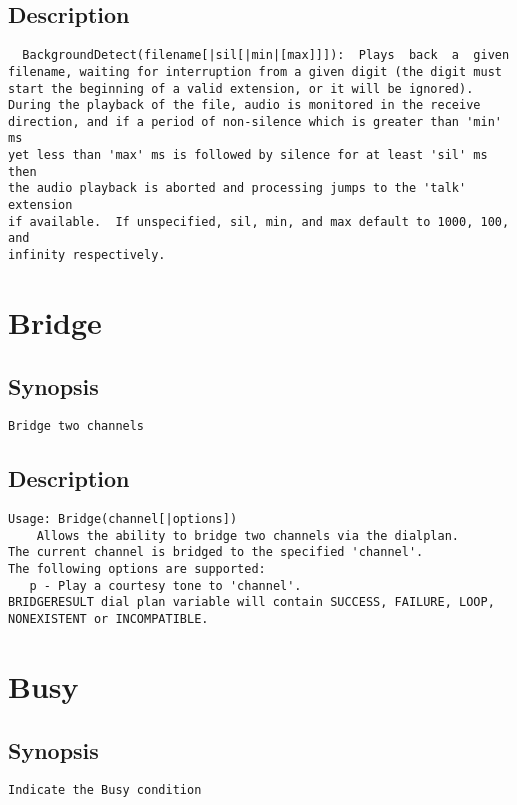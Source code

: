 \subsection{Description}
\begin{verbatim}
  BackgroundDetect(filename[|sil[|min|[max]]]):  Plays  back  a  given
filename, waiting for interruption from a given digit (the digit must
start the beginning of a valid extension, or it will be ignored).
During the playback of the file, audio is monitored in the receive
direction, and if a period of non-silence which is greater than 'min' ms
yet less than 'max' ms is followed by silence for at least 'sil' ms then
the audio playback is aborted and processing jumps to the 'talk' extension
if available.  If unspecified, sil, min, and max default to 1000, 100, and
infinity respectively.

\end{verbatim}


\section{Bridge}
\subsection{Synopsis}
\begin{verbatim}
Bridge two channels
\end{verbatim}
\subsection{Description}
\begin{verbatim}
Usage: Bridge(channel[|options])
	Allows the ability to bridge two channels via the dialplan.
The current channel is bridged to the specified 'channel'.
The following options are supported:
   p - Play a courtesy tone to 'channel'.
BRIDGERESULT dial plan variable will contain SUCCESS, FAILURE, LOOP, NONEXISTENT or INCOMPATIBLE.

\end{verbatim}


\section{Busy}
\subsection{Synopsis}
\begin{verbatim}
Indicate the Busy condition
\end{verbatim}
